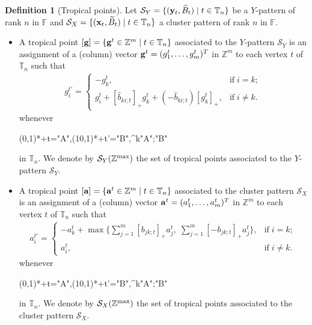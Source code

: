\documentclass[12pt]{amsart}
\theoremstyle{definition}
\newtheorem{definition}[theorem]{Definition}
\theoremstyle{remark}
\numberwithin{equation}{section}
\def\TT{\mathbb{T}}
\begin{document}
\begin{definition}[Tropical points]
    Let $\mathcal S_Y=\{({\bf y}_t, \widehat B_t)\mid t\in \mathbb T_n\}$ be a $Y$-pattern of rank $n$ in $\mathbb F$ and $\mathcal S_X=\{({\bf x}_t, \widetilde B_t)\mid t\in \mathbb T_n\}$ a cluster pattern of rank $n$ in $\mathbb F$.
\begin{itemize}
    \item [(i)] A tropical point $[{\bf g}]=\{{\bf g}^t\in\mathbb Z^m\mid t\in\mathbb T_n\}$ associated to the $Y$-pattern $\mathcal S_Y$ is an assignment of a (column) vector ${\bf g}^t=(g_{1}^t,\ldots,g_{m}^t)^T$ in $\mathbb Z^m$ to each vertex $t$ of $\mathbb T_n$ such that
    \begin{eqnarray}\label{eqn:y-trop}
g_{i}^{t'}=\begin{cases}-g_{k}^t,& \text{if}\;i=k;\\ g_{i}^t+[\hat b_{ki;t}]_+g_{k}^t+(-\hat b_{ki;t})[g_{k}^t]_+,&\text{if}\;i\neq k. \end{cases}
\end{eqnarray}
whenever
	\begin{xy}(0,1)*+{t}="A",(10,1)*+{t'}="B",\ar@{-}^k"A";"B" \end{xy} in $\TT_n$. We denote by $\mathcal S_Y(\mathbb Z^{\rm max})$ the set of tropical points associated to the $Y$-pattern $\mathcal S_Y$.

 \item[(ii)] A tropical point $[{\bf a}]=\{{\bf a}^t\in\mathbb Z^m\mid t\in\mathbb T_n\}$ associated to the cluster pattern $\mathcal S_X$ is an assignment of a (column) vector ${\bf a}^t=(a_{1}^t,\ldots,a_{m}^t)^T$ in $\mathbb Z^m$ to each vertex $t$ of $\mathbb T_n$ such that
    \begin{eqnarray}\label{eqn:x-trop}
a_{i}^{t'}=\begin{cases}-a_{k}^t+\max\{\sum_{j=1}^m[b_{jk;t}]_+a_{j}^t, \; \sum_{j=1}^m[-b_{jk;t}]_+a_{j}^t\}
,& \text{if}\;i=k;\\ a_{i}^t,&\text{if}\;i\neq k. \end{cases}
\end{eqnarray}
whenever
	\begin{xy}(0,1)*+{t}="A",(10,1)*+{t'}="B",\ar@{-}^k"A";"B" \end{xy} in $\TT_n$.
 We denote by $\mathcal S_X(\mathbb Z^{\rm max})$ the set of tropical points associated to the cluster pattern $\mathcal S_X$.
\end{itemize}
\end{definition}
\end{document}
